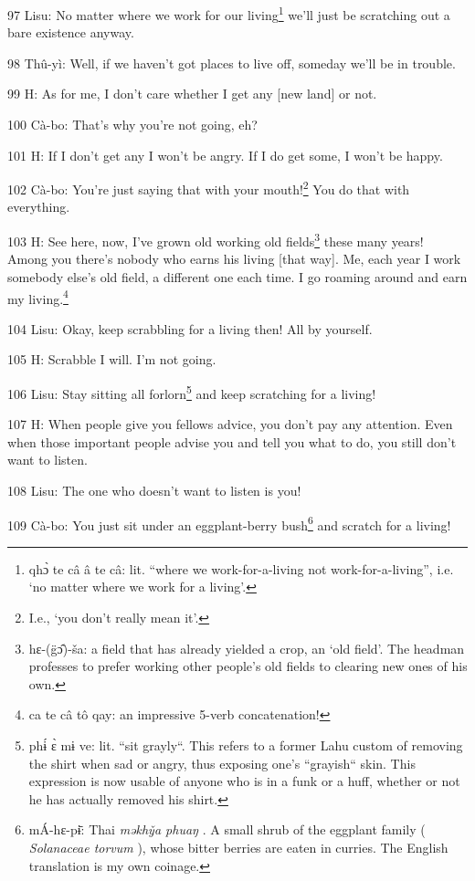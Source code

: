 97 Lisu: No matter where we work for our living\footnote{qhɔ̀ te câ â te câ: lit. ``where we work-for-a-living not work-for-a-living'', i.e. `no matter where we work for a living'.} we'll just be scratching out
a bare existence anyway.

98 Thû-yì: Well, if we haven't got places to live off, someday we'll be in trouble.

99 H: As for me, I don't care whether I get any [new land] or not.

100 Cà-bo: That's why you're not going, eh?

101 H: If I don't get any I won't be angry. If I do get some, I won't be happy.

102 Cà-bo: You're just saying that with your mouth!\footnote{I.e., `you don't really mean it'.} You do that with everything.

103 H: See here, now, I've grown old working old fields\footnote{hɛ-(g̈ɔ̂)-ša: a field that has already yielded a crop, an `old field'. The headman professes to prefer working other people's old fields to clearing new ones of his own.} these many years! Among
you there's nobody who earns his living [that way]. Me, each year I work somebody
else's old field, a different one each time. I go roaming around and earn my living.\footnote{ca te câ tô qay: an impressive 5-verb concatenation!}

104 Lisu: Okay, keep scrabbling for a living then! All by yourself.

105 H: Scrabble I will. I'm not going.

106 Lisu: Stay sitting all forlorn\footnote{phɨ́ ɛ̀ mɨ ve: lit. ``sit grayly``. This refers to a former Lahu custom of removing the shirt when sad or angry, thus exposing one's ``grayish`` skin. This expression is now usable of anyone who is in a funk or a huff, whether or not he has actually removed his shirt.} and keep scratching for a living!

107 H: When people give you fellows advice, you don't pay any attention. Even when
those important people advise you and tell you what to do, you still don't want
to listen.

108 Lisu: The one who doesn't want to listen is you!

109 Cà-bo: You just sit under an eggplant-berry bush\footnote{mÁ-hɛ-pɨ̄: Thai  \textit{məkhy̌a phuaŋ }. A small shrub of the eggplant family ( \textit{Solanaceae torvum }), whose bitter berries are eaten in curries. The English translation is my own coinage.} and scratch for a living!

